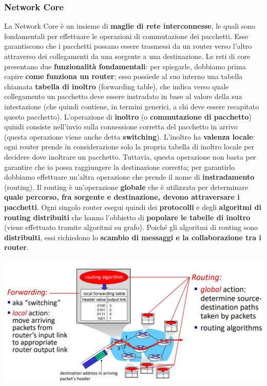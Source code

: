 \documentclass[12pt]{article}
\begin{document}
\subsubsection{Network Core}
La Network Core è un insieme di \textbf{maglie di rete interconnesse}, le quali sono fondamentali per effettuare le
operazioni di commutazione dei pacchetti. Esse garantiscono che i pacchetti possano essere trasmessi da un router verso l'altro
attraverso dei collegamenti da una sorgente a una destinazione.
Le reti di core presentano due \textbf{funzionalità fondamentali}:
per spiegarle, dobbiamo prima capire \textbf{come funziona un router}: esso possiede al suo interno una tabella chiamata
\textbf{tabella di inoltro} (forwarding table), che indica verso quale collegamento un pacchetto deve essere instradato in base al valore
della sua intestazione (che quindi contiene, in termini generici, a chi deve essere recapitato questo pacchetto).
L'operazione di \textbf{inoltro} (o \textbf{commutazione di pacchetto}) quindi consiste nell'invio sulla connessione corretta del pacchetto in arrivo (questa operazione viene anche detta \textbf{switching}).
L'inoltro ha \textbf{valenza locale}: ogni router prende in considerazione solo la propria tabella di inoltro locale per decidere dove inoltrare un pacchetto.
Tuttavia, questa operazione non basta per garantire che io possa raggiungere la destinazione corretta; per garantirlo dobbiamo effettuare un'altra operazione che prende il nome di
\textbf{instradamento} (routing). Il routing è un'operazione \textbf{globale} che è utilizzata per determinare \textbf{quale percorso, fra sorgente e destinazione, devono attraversare i pacchetti}.
Ogni singolo router esegui quindi dei \textbf{protocolli} e degli \textbf{algoritmi di routing distribuiti} che hanno l'obbietto di \textbf{popolare le tabelle di inoltro} (viene effettuato tramite algoritmi su grafo).
Poiché gli algoritmi di routing sono \textbf{distribuiti}, essi richiedono lo \textbf{scambio di messaggi e la collaborazione tra i router}.
\begin{center}
    \includegraphics[width = 1\linewidth]{Images/5.PNG}
\end{center}
\end{document}
